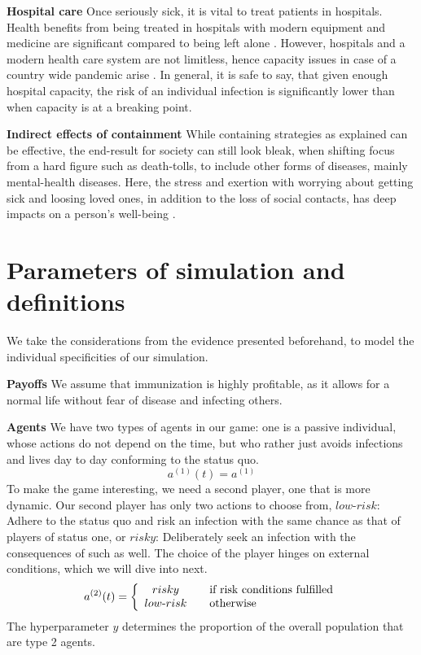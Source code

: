 \documentclass[]{article}
\begin{document}
\textbf{Hospital care}\newline
Once seriously sick, it is vital to treat patients in hospitals. Health benefits from being treated in hospitals with modern equipment and medicine are significant compared to being left alone \cite{beigel2020remdesivir}. However, hospitals and a modern health care system are not limitless, hence capacity issues in case of a country wide pandemic arise \cite{ranney2020critical}. In general, it is safe to say, that given enough hospital capacity, the risk of an individual infection is significantly lower than when capacity is at a breaking point. 

\textbf{Indirect effects of containment}\newline
While containing strategies as explained can be effective, the end-result for society can still look bleak, when shifting focus from a hard figure such as death-tolls, to include other forms of diseases, mainly mental-health diseases. Here, the stress and exertion with worrying about getting sick and loosing loved ones, in addition to the loss of social contacts, has deep impacts on a person's well-being \cite{pfefferbaum2020mental}. 

\section{Parameters of simulation and definitions}
\label{sec/params}

We take the considerations from the evidence presented beforehand, to model the individual specificities of our simulation. 

\textbf{Payoffs}\newline
We assume that immunization is highly profitable, as it allows for a normal life without fear of disease and infecting others. 

\textbf{Agents} \newline 
We have two types of agents in our game: one is a passive individual, whose actions do not depend on the time, but who rather just avoids infections and lives day to day conforming to the status quo. 
$$a^{(1)}(t) = a^{(1)}$$
To make the game interesting, we need a second player, one that is more dynamic. Our second player has only two actions to choose from, $low\textrm{-}risk$: Adhere to the status quo and risk an infection with the same chance as that of players of status one, or $risky$: Deliberately seek an infection with the consequences of such as well. The choice of the player hinges on external conditions, which we will dive into next.
$$a^{(2)}(t) = \left\{ 
  \begin{array}{ c l }
    risky & \quad \textrm{if risk conditions fulfilled} \\
    low\textrm{-}risk & \quad \textrm{otherwise}
  \end{array}
\right.$$
The hyperparameter $y$ determines the proportion of the overall population that are type 2 agents.
\end{document}
